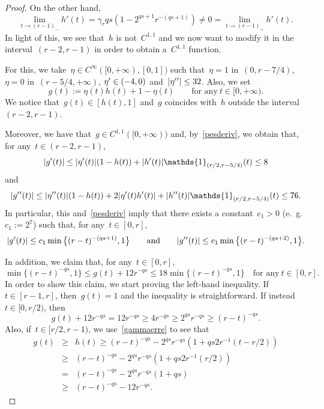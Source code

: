 \documentclass[10pt,a4paper]{amsart}
\numberwithin{equation}{section}
\begin{document}
\begin{proof}
On the other hand,
$$ \lim_{t\to (r-1)_-} h'(t)=\gamma_r qs\left(1-2^{qs+1}r^{-(qs+1)}\right)\neq 0 = \lim_{t\to (r-1)_+} h'(t).$$
In light of this, we see that~$h$ is not~$ C^{1,1}$
and we now want to modify it in the interval~$(r-2,r-1)$
in order to obtain a~$C^{1,1}$ function.

For this, we take~$\eta \in C^{\infty}([0,+\infty),[0,1])$ such that~$\eta =1$
in~$(0,r-7/4)$, $\eta =0$ in~$(r-5/4,+\infty)$, $\eta\rq{} \in (-4,0)$ and~$| \eta\rq{}\rq{} | \leq 32$. Also, we set
\[ g(t):= \eta(t) h(t)+1-\eta(t) \qquad\mbox{for any} \ t \in[ 0,+\infty). \]
We notice that~$g(t) \in [h(t),1]$ and~$g$ coincides with~$h$ outside the interval~$(r-2,r-1)$. 

Moreover, we have that~$g \in C^{1,1}([0,+\infty))$ and, by~\eqref{pesderiv}, we obtain that, for any~$t \in (r-2,r-1)$,
\begin{equation*}
 |g\rq{}(t) | \leq |\eta\rq{}(t)| (1-h(t)) + |h\rq{}(t)| \mathds{1}_{(r/2,r-5/4)}(t) \leq 8
\end{equation*}
and
\begin{equation*}
| g\rq{}\rq{}(t)| \leq | \eta \rq{}\rq{}(t)| (1-h(t)) +2 |\eta\rq{}(t) h\rq{}(t) |+ | h\rq{}\rq{}(t) | \mathds{1}_{(r/2,r-5/4)}(t) \leq 76.
\end{equation*}
In particular, this and~\eqref{pesderiv} imply that there exists a constant~$c_1>0$ (e.~\!g.~$c_1:=2^7$) such that,
for any~$t \in [0,r]$,
\begin{equation}\label{fandstrst}
| g\rq{}(t) | \leq c_1 \min \big\{ (r-t)^{-(qs+1)},1 \big\} \qquad\mbox{and}\qquad | g\rq{}\rq{}(t) | \leq c_1 \min\big\{(r-t)^{-(qs+2)},1 \big\}.
\end{equation}

In addition, we claim that, for any~$t \in [0,r]$,
\begin{equation}\label{tdj96}
\min\{(r-t)^{-qs},1 \} \leq g(t) + 12 r^{-qs} \leq 18  \min \{(r-t)^{-qs},1\} \quad\mbox{for any} \ t \in [0,r].
\end{equation}
In order to show this claim, we start proving the left-hand inequality. If~$t \in [r-1,r]$, then~$g(t)=1$ and the inequality is straightforward. If instead~$t \in [0,r/2)$, then
\begin{equation*}
g(t)+12r^{-qs}= 12 r^{-qs} \geq 4 r^{-qs} \geq 2^{qs} r^{-qs} \geq (r-t)^{-qs}. 
\end{equation*}
Also, if~$t \in [r/2,r-1)$, we use~\eqref{gammaerre} to see that
\begin{eqnarray*}
g(t) & \geq & h(t) \geq (r-t)^{-qs} - 2^{qs}r^{-qs}\left(1+qs2r^{-1}(t-r/2) \right)\\
&\geq & (r-t)^{-qs} - 2^{qs}r^{-qs}\left(1+qs2r^{-1}(r/2) \right)\\
& = & (r-t)^{-qs}  - 2^{qs}r^{-qs}(1+qs)\\
& \geq &  (r-t)^{-qs}  - 12 r^{-qs}.
\end{eqnarray*}


\end{proof}
\end{document}
